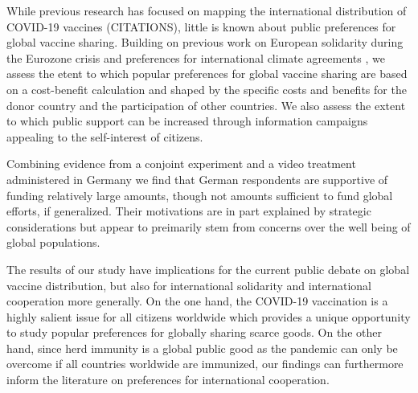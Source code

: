 \documentclass[12pt,oneside,smallheadings,chapterprefix=true]{article}
\begin{document}


While previous research has focused on mapping the international distribution of COVID-19 vaccines (CITATIONS), little is known about public preferences for global vaccine sharing. Building on previous work on European solidarity during the Eurozone crisis \citep{Bechtel2017,Kuhn2018,Kuhn2020,Stoeckel2018} and preferences for international climate agreements \citep{Bechtel2013,Bechtel2017,Bechtel2019},  
we assess the etent to which popular preferences for global vaccine sharing are based on a cost-benefit calculation and shaped by the specific costs and benefits for the donor country and the participation of other countries. We also assess the extent to which public support can be increased through information campaigns appealing to the self-interest of citizens. 

Combining evidence from a conjoint experiment  and a video treatment administered in Germany we find that German respondents are supportive of funding relatively large amounts, though not amounts sufficient to fund global efforts, if generalized. Their motivations are in part explained by strategic considerations but appear to preimarily stem from concerns over the well being of global populations.

The results of our study have  implications for the current public debate on global vaccine distribution, but also for international solidarity and international cooperation more generally. On the one hand, the COVID-19 vaccination is a highly salient issue for all citizens worldwide which provides a unique opportunity to study popular preferences for globally sharing scarce goods. On the other hand, since herd immunity is a global public good as the pandemic can only be overcome if all countries worldwide are immunized, our findings can furthermore inform the literature on preferences for international cooperation. 



\end{document}
